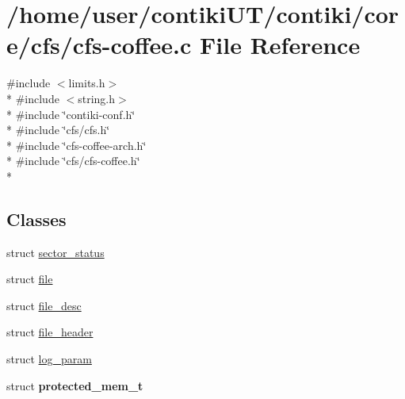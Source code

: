 \hypertarget{cfs-coffee_8c}{}\section{/home/user/contiki\+U\+T/contiki/core/cfs/cfs-\/coffee.c File Reference}
\label{cfs-coffee_8c}
{\ttfamily \#include $<$limits.\+h$>$}\\*
{\ttfamily \#include $<$string.\+h$>$}\\*
{\ttfamily \#include \char`\"{}contiki-\/conf.\+h\char`\"{}}\\*
{\ttfamily \#include \char`\"{}cfs/cfs.\+h\char`\"{}}\\*
{\ttfamily \#include \char`\"{}cfs-\/coffee-\/arch.\+h\char`\"{}}\\*
{\ttfamily \#include \char`\"{}cfs/cfs-\/coffee.\+h\char`\"{}}\\*
\subsection*{Classes}
\begin{DoxyCompactItemize}
\item 
struct \hyperlink{structsector__status}{sector\+\_\+status}
\item 
struct \hyperlink{structfile}{file}
\item 
struct \hyperlink{structfile__desc}{file\+\_\+desc}
\item 
struct \hyperlink{structfile__header}{file\+\_\+header}
\item 
struct \hyperlink{structlog__param}{log\+\_\+param}
\item 
struct {\bfseries protected\+\_\+mem\+\_\+t}
\end{DoxyCompactItemize}
